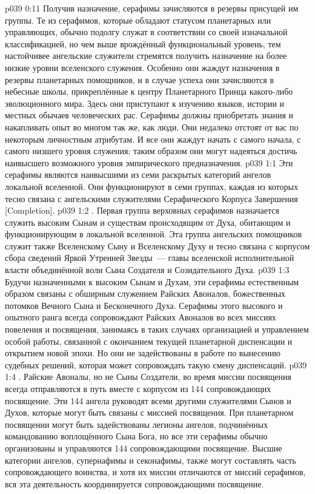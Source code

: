 \vs p039 0:11 Получив назначение, серафимы зачисляются в резервы присущей им группы. Те из серафимов, которые обладают статусом планетарных или управляющих, обычно подолгу служат в соответствии со своей изначальной классификацией, но чем выше врождённый функциональный уровень, тем настойчивее ангельские служители стремятся получить назначение на более низкие уровни вселенского служения. Особенно они жаждут назначения в резервы планетарных помощников, и в случае успеха они зачисляются в небесные школы, прикреплённые к центру Планетарного Принца какого\hyp{}либо эволюционного мира. Здесь они приступают к изучению языков, истории и местных обычаев человеческих рас. Серафимы должны приобретать знания и накапливать опыт во многом так же, как люди. Они недалеко отстоят от вас по некоторым личностным атрибутам. И все они жаждут начать с самого начала, с самого низшего уровня служения; таким образом они могут надеяться достичь наивысшего возможного уровня эмпирического предназначения.
\vs p039 1:1 Эти серафимы являются наивысшими из семи раскрытых категорий ангелов локальной вселенной. Они функционируют в семи группах, каждая из которых тесно связана с ангельскими служителями Серафического Корпуса Завершения [Completion].
\vs p039 1:2 . Первая группа верховных серафимов назначается служить высоким Сынам и существам происходящим от Духа, обитающим и функционирующим в локальной вселенной. Эта группа ангельских помощников служит также Вселенскому Сыну и Вселенскому Духу и тесно связана с корпусом сбора сведений Яркой Утренней Звезды~--- главы вселенской исполнительной власти объединённой воли Сына Создателя и Созидательного Духа.
\vs p039 1:3 Будучи назначенными к высоким Сынам и Духам, эти серафимы естественным образом связаны с обширным служением Райских Авоналов, божественных потомков Вечного Сына и Бесконечного Духа. Серафимы этого высокого и опытного ранга всегда сопровождают Райских Авоналов во всех миссиях повеления и посвящения, занимаясь в таких случаях организацией и управлением особой работы, связанной с окончанием текущей планетарной диспенсации и открытием новой эпохи. Но они не задействованы в работе по вынесению судебных решений, которая может сопровождать такую смену диспенсаций.
\vs p039 1:4 \pc {}. Райские Авоналы, но не Сыны Создатели, во время миссии посвящения всегда отправляются в путь вместе с корпусом из 144 сопровождающих посвящение. Эти 144 ангела руководят всеми другими служителями Сынов и Духов, которые могут быть связаны с миссией посвящения. При планетарном посвящении могут быть задействованы легионы ангелов, подчинённых командованию воплощённого Сына Бога, но все эти серафимы обычно организованы и управляются 144 сопровождающими посвящение. Высшие категории ангелов, супернафимы и секонафимы, также могут составлять часть сопровождающего воинства, и хотя их миссии отличаются от миссий серафимов, вся эта деятельность координируется сопровождающими посвящение.
